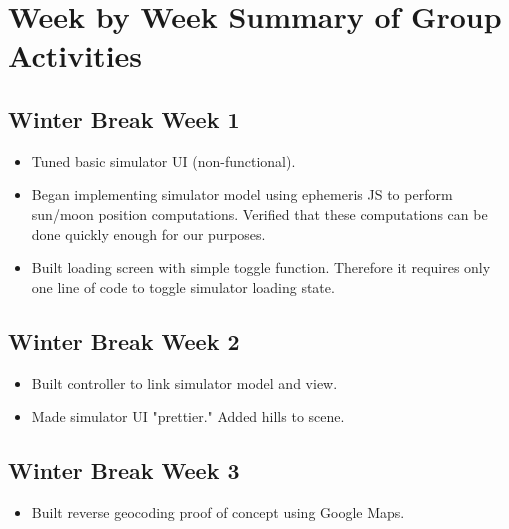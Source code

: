 \documentclass[10pt, onecolumn, draftclsnofoot, letterpaper, compsoc]{IEEEtran}
\begin{document}
\newpage
\section{Week by Week Summary of Group Activities}

\subsection{Winter Break Week 1}

    \begin{itemize}

    \item Tuned basic simulator UI (non-functional).

	\item Began implementing simulator model using ephemeris JS to perform sun/moon
		  position computations. Verified that these computations can be done
		  quickly enough for our purposes.

	\item Built loading screen with simple toggle function. Therefore it requires only
		  one line of code to toggle simulator loading state.

    \end{itemize}

\subsection{Winter Break Week 2}

    \begin{itemize}

    \item Built controller to link simulator model and view.

	\item Made simulator UI "prettier." Added hills to scene.

    \end{itemize}

\subsection{Winter Break Week 3}

    \begin{itemize}

    \item Built reverse geocoding proof of concept using Google Maps.

    \end{itemize}
\end{document}
